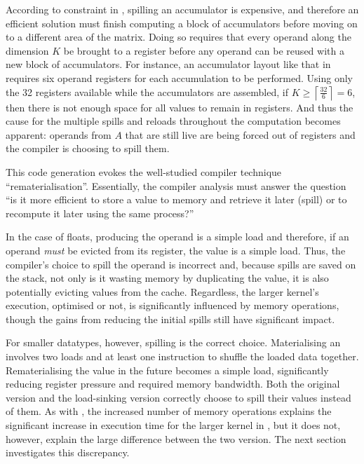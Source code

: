 \documentclass[\main/thesis.tex]{subfiles}
\begin{document}
According to constraint  in , spilling an accumulator is expensive, and therefore an efficient solution must finish computing a block of accumulators before moving on to a different area of the matrix.
Doing so requires that every operand along the dimension $K$ be brought to a register before any operand can be reused with a new block of accumulators.
For instance, an accumulator layout like that in  requires six operand registers for each accumulation to be performed.
Using only the 32 registers available while the accumulators are assembled, if $K \geq \left\lceil \frac{32}{6} \right\rceil = 6$, then there is not enough space for all values to remain in registers.
And thus the cause for the multiple spills and reloads throughout the computation becomes apparent: operands from $A$ that are still \gls{live} are being forced out of registers and the compiler is choosing to spill them.\footnotemark
{}

This code generation evokes the well-studied compiler technique ``\gls{rematerialisation}''.
Essentially, the compiler analysis must answer the question ``is it more efficient to store a value to memory and retrieve it later (\gls{spill}) or to recompute it later using the same process?''

In the case of floats, producing the operand is a simple load and therefore, if an operand \emph{must} be evicted from its register,  the value is a simple load.
Thus, the compiler's choice to spill the operand is incorrect and, because spills are saved on the stack, not only is it wasting memory by duplicating the value, it is also potentially evicting values from the cache.
Regardless, the larger kernel's execution, optimised or not, is significantly influenced by memory operations, though the gains from reducing the initial spills still have significant impact.

For smaller datatypes, however, spilling is the correct choice.
Materialising an  involves two loads and at least one instruction to shuffle the loaded data together.
Rematerialising the value in the future becomes a simple load, significantly reducing register pressure and required memory bandwidth.
Both the original version and the load-sinking version correctly choose to spill their values instead of  them.
As with , the increased number of memory operations explains the significant increase in execution time for the larger  kernel in , but it does not, however, explain the large difference between the two version.
The next section investigates this discrepancy.
\end{document}
